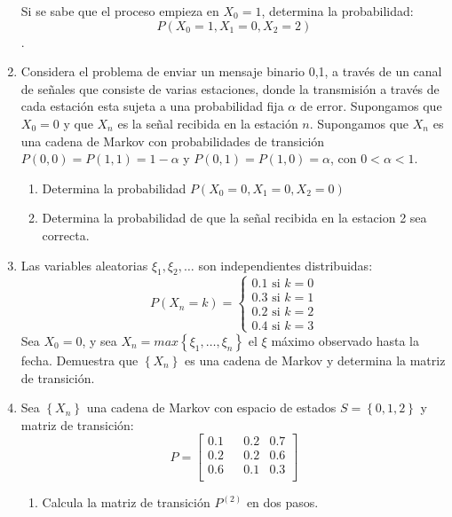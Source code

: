 \documentclass{report}
\begin{document}
\begin{enumerate}
          Si se sabe que el proceso empieza en $X_0=1$, determina la probabilidad:
           $$P\left(X_0=1,X_1=0, X_2 = 2 \right)$$.
    \item Considera el problema de enviar un mensaje binario 0,1, a través de un canal de señales que consiste de varias estaciones, donde la transmisión a través de cada estación esta sujeta a una probabilidad fija $\alpha$ de error. Supongamos que $X_0=0$ y que $X_n$ es la señal recibida en la estación $n$.  Supongamos que $X_n$ es una cadena de Markov con probabilidades de transición $P(0,0) = P(1,1)= 1-\alpha$ y $P(0,1)=P(1,0)= \alpha$, con $0<\alpha<1$.
          \begin{enumerate}
              \item Determina la probabilidad $P\left(X_0=0,X_1=0, X_2=0\right)$
              \item Determina la probabilidad de que la señal recibida en la estacion 2 sea correcta.
          \end{enumerate}
    \item Las variables aleatorias $\xi_1, \xi_2, \ldots$ son independientes distribuidas:
          $$
              P\left(X_n=k\right)=
              \begin{cases}
                  0.1 \text{ si } k = 0 \\
                  0.3 \text{ si } k = 1 \\
                  0.2 \text{ si } k = 2 \\
                  0.4 \text{ si } k = 3
              \end{cases}
          $$
          Sea $X_0=0$, y sea $X_n= max\left\{\xi_1, \ldots,\xi_n\right\}$ el $\xi$ máximo observado hasta la fecha. Demuestra que $\left\{X_n\right\}$ es una cadena de Markov y determina la matriz de transición.
    \item Sea $\left\{X_n\right\}$ una cadena de Markov con espacio de estados $S = \left\{0,1,2\right\}$ y matriz de transición:
          $$P= \left[
                  \begin{matrix}
                      0.1 &  & 0.2 & 0.7 \\
                      0.2 &  & 0.2 & 0.6 \\
                      0.6 &  & 0.1 & 0.3 \\
                  \end{matrix}
                  \right]
          $$
          \begin{enumerate}
              \item Calcula la matriz de transición $P^{(2)}$ en dos pasos.

\end{enumerate}
\end{enumerate}
\end{document}
